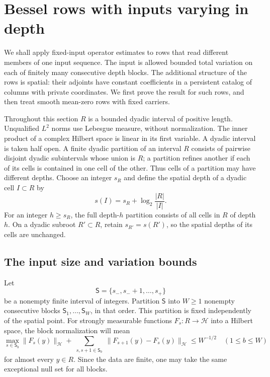 \section{Bessel rows with inputs varying in depth}
\label{sec:rows}

We shall apply fixed-input operator estimates to rows that read different
members of one input sequence.  The input is allowed bounded total variation
on each of finitely many consecutive depth blocks.  The additional structure
of the rows is spatial: their adjoints have constant coefficients in a
persistent catalog of columns with private coordinates.  We first prove the
result for such rows, and then treat smooth mean-zero rows with fixed
carriers.

Throughout this section $R$ is a bounded dyadic interval of positive length.
Unqualified $L^2$ norms use Lebesgue measure, without normalization.
The inner product of a complex Hilbert space is linear in its first
variable.  A dyadic interval is taken half open.  A finite dyadic partition
of an interval $R$ consists of pairwise disjoint dyadic subintervals whose
union is $R$; a partition refines another if each of its cells is contained
in one cell of the other.  Thus cells of a partition may have different
depths.  Choose an integer $s_R$ and define the spatial depth of a dyadic
cell $I\subset R$ by
\[
 s(I)=s_R+\log_2\frac{|R|}{|I|}.
\]
For an integer $h\ge s_R$, the full depth-$h$ partition consists of all
cells in $R$ of depth $h$.  On a dyadic subroot $R'\subset R$, retain
$s_{R'}=s(R')$, so the spatial depths of its cells are unchanged.

\subsection{The input size and variation bounds}

Let
\[
 \mathsf S=\{s_-,s_-+1,\ldots,s_+\}
\]
be a nonempty finite interval of integers.  Partition $\mathsf S$ into
$W\ge1$ nonempty consecutive blocks $\mathsf S_1,\ldots,\mathsf S_W$,
in that order.  This partition is fixed independently of the spatial
point.  For strongly measurable functions $F_s:R\to\mathcal H$ into a
Hilbert space, the block normalization will mean
\begin{equation}
 \max_{s\in\mathsf S_b}\|F_s(y)\|_{\mathcal H}
 +\sum_{\substack{s,s+1\in\mathsf S_b}}
       \|F_{s+1}(y)-F_s(y)\|_{\mathcal H}
 \le W^{-1/2}
 \quad (1\le b\le W)
 \label{eq:row-input-normalization}
\end{equation}
for almost every $y\in R$.  Since the data are finite, one may take the
same exceptional null set for all blocks.

